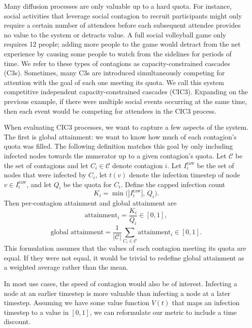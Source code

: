 \documentclass{article}
\begin{document}
Many diffusion processes are only valuable up to a hard quota. For instance, social activities that leverage social contagion to recruit participants might only require a certain number of attendees before each subsequent attendee provides no value to the system or detracts value. A full social volleyball game only requires 12 people; adding more people to the game would detract from the net experience by causing some people to watch from the sidelines for periods of time. We refer to these types of contagions as capacity-constrained cascades (C3s). Sometimes, many C3s are introduced simultaneously competing for attention with the goal of each one meeting its quota. We call this system competitive independent capacity-constrained cascades (CIC3). Expanding on the previous example, if there were multiple social events occurring at the same time, then each event would be competing for attendees in the CIC3 process.

When evaluating CIC3 processes, we want to capture a few aspects of the system. The first is global attainment: we want to know how much of each contagion's quota was filled. The following definition matches this goal by only including infected nodes towards the numerator up to a given contagion's quota. Let $\mathcal{C}$ be the set of contagions and let $C_i \in \mathcal{C}$ denote contagion $i$. Let $I_i^{\text{raw}}$ be the set of nodes that were infected by $C_i$, let $t(v)$ denote the infection timestep of node $v \in I_i^{\text{raw}}$, and let $Q_i$ be the quota for $C_i$. Define the capped infection count
\begin{equation}
K_i = \min\!\big(|I_i^{\text{raw}}|,\, Q_i\big).
\end{equation}
Then per-contagion attainment and global attainment are
\begin{equation}
\text{attainment}_i = \frac{K_i}{Q_i} \in [0,1],
\end{equation}
\begin{equation}
\text{global attainment} = \frac{1}{|\mathcal{C}|} \sum_{C_i \in \mathcal{C}} \text{attainment}_i \in [0,1].
\end{equation}
This formulation assumes that the values of each contagion meeting its quota are equal. If they were not equal, it would be trivial to redefine global attainment as a weighted average rather than the mean.

In most use cases, the speed of contagion would also be of interest. Infecting a node at an earlier timestep is more valuable than infecting a node at a later timestep. Assuming we have some value function $V(t)$ that maps an infection timestep to a value in $[0,1]$, we can reformulate our metric to include a time discount.
\end{document}
